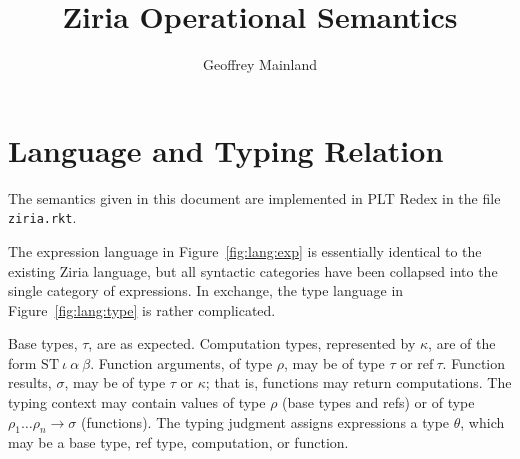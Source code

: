 \documentclass[twocolumn]{article}
\title{Ziria Operational Semantics}
\author{Geoffrey Mainland}
\newcommand{\kw}[1]{\mbox{#1}}
\begin{document}
\maketitle

\section{Language and Typing Relation}

The semantics given in this document are implemented in PLT Redex in the file \texttt{ziria.rkt}.

The expression language in Figure~\ref{fig:lang:exp} is essentially identical to the
existing Ziria language, but all syntactic categories have been collapsed into
the single category of expressions. In exchange, the type language in
Figure~\ref{fig:lang:type} is rather complicated.

Base types, $\tau$, are as expected. Computation types, represented by $\kappa$,
are of the form $\kw{ST}~ \iota~ \alpha~ \beta$. Function arguments, of type
$\rho$, may be of type $\tau$ or $\kw{ref}~ \tau$. Function results, $\sigma$,
may be of type $\tau$ or $\kappa$; that is, functions may return
computations. The typing context may contain values of type $\rho$ (base types
and refs) or of type $\rho_1 \ldots \rho_n \to \sigma$ (functions). The typing
judgment assigns expressions a type $\theta$, which may be a base type, ref
type, computation, or function.
\end{document}
